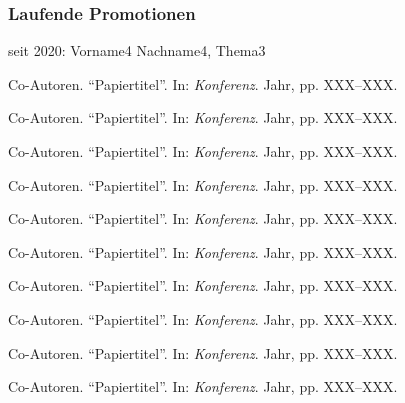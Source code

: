 \documentclass[checked=true,walterbenjamin=false]{dfg-cv-en}
\begin{document}
\subsubsection*{Laufende Promotionen}
\begin{compactItemize}
\item seit 2020: Vorname4 Nachname4, Thema3    
\end{compactItemize}


\secErgebnisse %

\secKatA %

\begin{compactEnumerate}
    \item Co-Autoren. \enquote{Papiertitel}. In: \emph{Konferenz}. Jahr, pp. XXX–XXX.
    \item Co-Autoren. \enquote{Papiertitel}. In: \emph{Konferenz}. Jahr, pp. XXX–XXX.
    \item Co-Autoren. \enquote{Papiertitel}. In: \emph{Konferenz}. Jahr, pp. XXX–XXX.
    \item Co-Autoren. \enquote{Papiertitel}. In: \emph{Konferenz}. Jahr, pp. XXX–XXX.
    \item Co-Autoren. \enquote{Papiertitel}. In: \emph{Konferenz}. Jahr, pp. XXX–XXX.
    \item Co-Autoren. \enquote{Papiertitel}. In: \emph{Konferenz}. Jahr, pp. XXX–XXX.
    \item Co-Autoren. \enquote{Papiertitel}. In: \emph{Konferenz}. Jahr, pp. XXX–XXX.
    \item Co-Autoren. \enquote{Papiertitel}. In: \emph{Konferenz}. Jahr, pp. XXX–XXX.
    \item Co-Autoren. \enquote{Papiertitel}. In: \emph{Konferenz}. Jahr, pp. XXX–XXX.
    \item Co-Autoren. \enquote{Papiertitel}. In: \emph{Konferenz}. Jahr, pp. XXX–XXX.
\end{compactEnumerate}

\secKatB \optionaltext %
\end{document}
